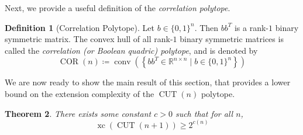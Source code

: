 \documentclass{article}
\newtheorem{theorem}{\sc Theorem}
\theoremstyle{definition}
\newtheorem{definition}[theorem]{Definition}
\theoremstyle{remark}
\newcommand{\conv}{\operatorname{conv}}
\newcommand{\xc}{\operatorname{xc}}
\newcommand{\CUT}{\operatorname{CUT}}
\newcommand{\COR}{\operatorname{COR}}
\renewcommand{\R}{\mathbb{R}}
\begin{document}
Next, we provide a useful definition of the \textit{correlation polytope}.

\begin{definition}[Correlation Polytope]\label{def:cor}
Let $b \in {\{0, 1\}}^n$. Then $b b^T$ is a rank-$1$ binary symmetric matrix. The convex hull of all rank-$1$ binary symmetric matrices is called
the \textit{correlation (or Boolean quadric) polytope}, and is denoted by
\[
\COR(n) \coloneqq \conv\left( \left\{ bb^T \in \R^{n \times n} \mid b \in {\{0, 1\}}^n \right\} \right)
\]
\end{definition}

We are now ready to show the main result of this section, that provides a lower bound on the extension complexity of the $\CUT(n)$ polytope.

\begin{theorem}\label{theor:cut}
There exists some constant $c > 0$ such that for all $n$,
\[
\xc(\CUT(n+1)) \geq 2^{c(n)}
\]
\end{theorem}
\end{document}

